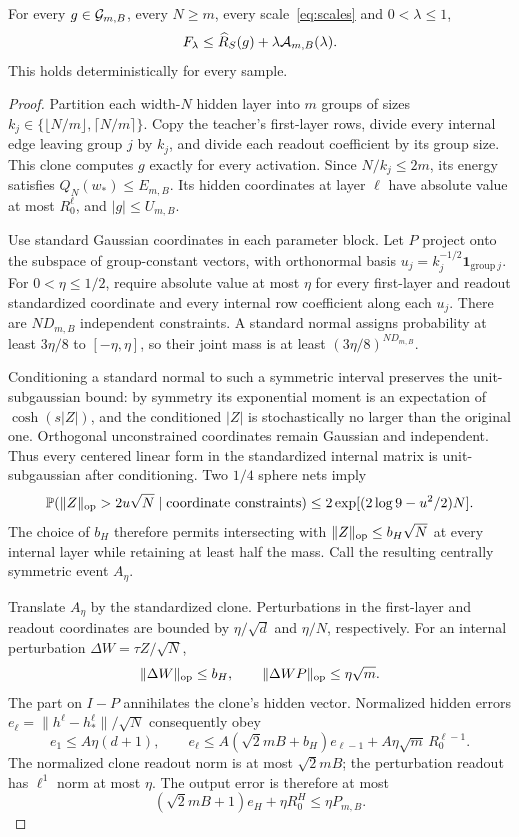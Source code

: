 \begin{lemma}
\label{lem:teacher}
For every $g\in\mathcal G_{m,B}$, every $N\ge m$, every scale~\eqref{eq:scales} and $0<\lambda\le1$,
\begin{equation}
 F_\lambda\le\widehat R_S(g)+\lambda\mathcal A_{m,B}(\lambda).
 \label{eq:teacher-comparison}
\end{equation}
This holds deterministically for every sample.
\end{lemma}
\begin{proof}
Partition each width-$N$ hidden layer into $m$ groups of sizes
$k_j\in\{\lfloor N/m\rfloor,\lceil N/m\rceil\}$. Copy the teacher's first-layer rows, divide every internal edge leaving group $j$ by $k_j$, and divide each readout coefficient by its group size. This clone computes $g$ exactly for every activation. Since $N/k_j\le2m$, its energy satisfies $Q_N(w_*)\le E_{m,B}$. Its hidden coordinates at layer $\ell$ have absolute value at most $R_0^\ell$, and $|g|\le U_{m,B}$.

Use standard Gaussian coordinates in each parameter block. Let $P$ project onto the subspace of group-constant vectors, with orthonormal basis $u_j=k_j^{-1/2}\mathbf1_{\mathrm{group}\ j}$. For $0<\eta\le1/2$, require absolute value at most $\eta$ for every first-layer and readout standardized coordinate and every internal row coefficient along each $u_j$. There are $ND_{m,B}$ independent constraints. A standard normal assigns probability at least $3\eta/8$ to $[-\eta,\eta]$, so their joint mass is at least $(3\eta/8)^{ND_{m,B}}$.

Conditioning a standard normal to such a symmetric interval preserves the unit-subgaussian bound: by symmetry its exponential moment is an expectation of $\cosh(s|Z|)$, and the conditioned $|Z|$ is stochastically no larger than the original one. Orthogonal unconstrained coordinates remain Gaussian and independent. Thus every centered linear form in the standardized internal matrix is unit-subgaussian after conditioning. Two $1/4$ sphere nets imply
\[
 \mathbb P(\|Z\|_{\mathrm{op}}>2u\sqrt N\mid\text{coordinate constraints})
 \le2\exp[(2\log9-u^2/2)N].
\]
The choice of $b_H$ therefore permits intersecting with
$\|Z\|_{\mathrm{op}}\le b_H\sqrt N$ at every internal layer while retaining at least half the mass. Call the resulting centrally symmetric event $A_\eta$.

Translate $A_\eta$ by the standardized clone. Perturbations in the first-layer and readout coordinates are bounded by $\eta/\sqrt d$ and $\eta/N$, respectively. For an internal perturbation $\Delta W=\tau Z/\sqrt N$,
\[
 \|\Delta W\|_{\mathrm{op}}\le b_H,\qquad
 \|\Delta WP\|_{\mathrm{op}}\le\eta\sqrt m.
\]
The part on $I-P$ annihilates the clone's hidden vector. Normalized hidden errors $e_\ell=\|h^\ell-h_*^\ell\|/\sqrt N$ consequently obey
\[
 e_1\le A\eta(d+1),\qquad
 e_\ell\le A(\sqrt2mB+b_H)e_{\ell-1}
                         +A\eta\sqrt m\,R_0^{\ell-1}.
\]
The normalized clone readout norm is at most $\sqrt2mB$; the perturbation readout has $\ell^1$ norm at most $\eta$. The output error is therefore at most
\[
 (\sqrt2mB+1)e_H+\eta R_0^H\le\eta P_{m,B}.
\]


\end{proof}
